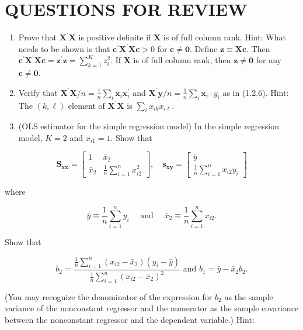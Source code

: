 \documentclass[10pt]{article}
\begin{document}
\section*{QUESTIONS FOR REVIEW}
\begin{enumerate}
  \item Prove that $\mathbf{X}^{\prime} \mathbf{X}$ is positive definite if $\mathbf{X}$ is of full column rank. Hint: What needs to be shown is that $\mathbf{c}^{\prime} \mathbf{X}^{\prime} \mathbf{X} \mathbf{c}>0$ for $\mathbf{c} \neq \mathbf{0}$. Define $\mathbf{z} \equiv \mathbf{X} \mathbf{c}$. Then $\mathbf{c}^{\prime} \mathbf{X}^{\prime} \mathbf{X} \mathbf{c}=\mathbf{z}^{\prime} \mathbf{z}=\sum_{k=1}^{K} z_{i}^{2}$. If $\mathbf{X}$ is of full column rank, then $\mathbf{z} \neq \mathbf{0}$ for any $\mathbf{c} \neq \mathbf{0}$.
  \item Verify that $\mathbf{X}^{\prime} \mathbf{X} / n=\frac{1}{n} \sum_{i} \mathbf{x}_{i} \mathbf{x}_{i}^{\prime}$ and $\mathbf{X}^{\prime} \mathbf{y} / n=\frac{1}{n} \sum_{i} \mathbf{x}_{i} \cdot y_{i}$ as in (1.2.6). Hint: The $(k, \ell)$ element of $\mathbf{X}^{\prime} \mathbf{X}$ is $\sum_{i} x_{i k} x_{i \ell}$.
  \item (OLS estimator for the simple regression model) In the simple regression model, $K=2$ and $x_{i 1}=1$. Show that
\end{enumerate}

$$
\mathbf{S}_{\mathbf{x x}}=\left[\begin{array}{cc}
1 & \bar{x}_{2} \\
\bar{x}_{2} & \frac{1}{n} \sum_{i=1}^{n} x_{i 2}^{2}
\end{array}\right], \quad \mathbf{s}_{\mathbf{x y}}=\left[\begin{array}{c}
\bar{y} \\
\frac{1}{n} \sum_{i=1}^{n} x_{i 2} y_{i}
\end{array}\right]
$$

where

$$
\bar{y} \equiv \frac{1}{n} \sum_{i=1}^{n} y_{i} \quad \text { and } \quad \bar{x}_{2} \equiv \frac{1}{n} \sum_{i=1}^{n} x_{i 2} .
$$

Show that

$$
b_{2}=\frac{\frac{1}{n} \sum_{i=1}^{n}\left(x_{i 2}-\bar{x}_{2}\right)\left(y_{i}-\bar{y}\right)}{\frac{1}{n} \sum_{i=1}^{n}\left(x_{i 2}-\bar{x}_{2}\right)^{2}} \text { and } b_{1}=\bar{y}-\bar{x}_{2} b_{2} .
$$

(You may recognize the denominator of the expression for $b_{2}$ as the sample variance of the nonconstant regressor and the numerator as the sample covariance between the nonconstant regressor and the dependent variable.) Hint:
\end{document}
